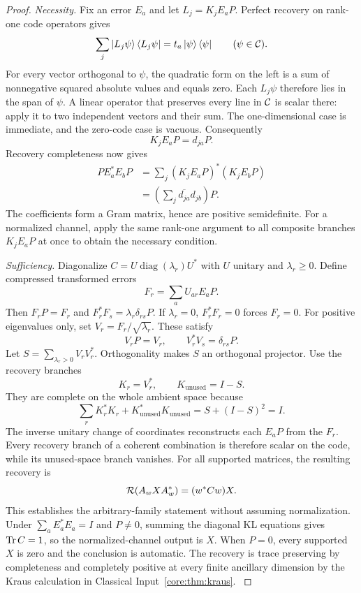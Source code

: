 \begin{proof}\label{core:proof:016}
\textit{Necessity.} Fix an error $E_a$ and let $L_j=K_jE_aP$. Perfect recovery on rank-one code operators gives
\[
\sum_j\ket{L_j\psi}\bra{L_j\psi}
=t_a\ket\psi\bra\psi\qquad(\psi\in\cC).
\]
For every vector orthogonal to $\psi$, the quadratic form on the left is a sum of nonnegative squared absolute values and equals zero. Each $L_j\psi$ therefore lies in the span of $\psi$. A linear operator that preserves every line in $\cC$ is scalar there: apply it to two independent vectors and their sum. The one-dimensional case is immediate, and the zero-code case is vacuous. Consequently
\[
K_jE_aP=d_{ja}P.
\]
Recovery completeness now gives
\[
\begin{aligned}
PE_a^*E_bP
&=\sum_j (K_jE_aP)^*(K_jE_bP)\\
&=\left(\sum_j\overline{d_{ja}}d_{jb}\right)P.
\end{aligned}
\]
The coefficients form a Gram matrix, hence are positive semidefinite. For a normalized channel, apply the same rank-one argument to all composite branches $K_jE_aP$ at once to obtain the necessary condition.

\textit{Sufficiency.} Diagonalize $C=U\operatorname{diag}(\lambda_r)U^*$ with $U$ unitary and $\lambda_r\ge0$. Define compressed transformed errors
\[
F_r=\sum_aU_{ar}E_aP.
\]
Then $F_rP=F_r$ and $F_r^*F_s=\lambda_r\delta_{rs}P$. If $\lambda_r=0$, $F_r^*F_r=0$ forces $F_r=0$. For positive eigenvalues only, set $V_r=F_r/\sqrt{\lambda_r}$. These satisfy
\[
V_rP=V_r,\qquad V_r^*V_s=\delta_{rs}P.
\]
Let $S=\sum_{\lambda_r>0}V_rV_r^*$. Orthogonality makes $S$ an orthogonal projector. Use the recovery branches
\[
K_r=V_r^*,\qquad K_{\mathrm{unused}}=I-S.
\]
They are complete on the whole ambient space because
\[
\sum_rK_r^*K_r+K_{\mathrm{unused}}^*K_{\mathrm{unused}}
=S+(I-S)^2=I.
\]
The inverse unitary change of coordinates reconstructs each $E_aP$ from the $F_r$. Every recovery branch of a coherent combination is therefore scalar on the code, while its unused-space branch vanishes. For all supported matrices, the resulting recovery is
\[
\cR(A_wXA_w^*)=(w^*Cw)X.
\]
This establishes the arbitrary-family statement without assuming normalization. Under $\sum_aE_a^*E_a=I$ and $P\ne0$, summing the diagonal KL equations gives $\operatorname{Tr} C=1$, so the normalized-channel output is $X$. When $P=0$, every supported $X$ is zero and the conclusion is automatic. The recovery is trace preserving by completeness and completely positive at every finite ancillary dimension by the Kraus calculation in Classical Input~\ref{core:thm:kraus}.
\label{core:proof:016:end}\end{proof}

